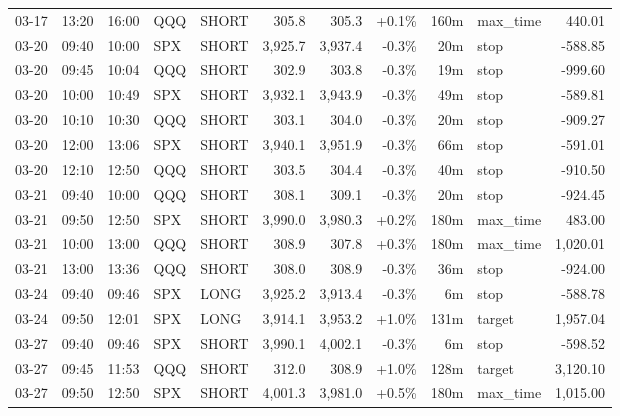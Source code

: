 \documentclass[11pt,a4paper,twoside]{article}
\begin{document}
\begin{center}
\begin{longtable}{>{\color{txtmain}}l l l l l r r r r >{\color{txtmain}}l r}
03-17 & 13:20 & 16:00 & QQQ & SHORT & 305.8 & 305.3 & \textcolor{wingreen}{+0.1\%} & 160m & max\_time & \textcolor{wingreen}{440.01} \\
03-20 & 09:40 & 10:00 & SPX & SHORT & 3,925.7 & 3,937.4 & \textcolor{lossred}{-0.3\%} & 20m & stop & \textcolor{lossred}{-588.85} \\
03-20 & 09:45 & 10:04 & QQQ & SHORT & 302.9 & 303.8 & \textcolor{lossred}{-0.3\%} & 19m & stop & \textcolor{lossred}{-999.60} \\
03-20 & 10:00 & 10:49 & SPX & SHORT & 3,932.1 & 3,943.9 & \textcolor{lossred}{-0.3\%} & 49m & stop & \textcolor{lossred}{-589.81} \\
03-20 & 10:10 & 10:30 & QQQ & SHORT & 303.1 & 304.0 & \textcolor{lossred}{-0.3\%} & 20m & stop & \textcolor{lossred}{-909.27} \\
03-20 & 12:00 & 13:06 & SPX & SHORT & 3,940.1 & 3,951.9 & \textcolor{lossred}{-0.3\%} & 66m & stop & \textcolor{lossred}{-591.01} \\
03-20 & 12:10 & 12:50 & QQQ & SHORT & 303.5 & 304.4 & \textcolor{lossred}{-0.3\%} & 40m & stop & \textcolor{lossred}{-910.50} \\
03-21 & 09:40 & 10:00 & QQQ & SHORT & 308.1 & 309.1 & \textcolor{lossred}{-0.3\%} & 20m & stop & \textcolor{lossred}{-924.45} \\
03-21 & 09:50 & 12:50 & SPX & SHORT & 3,990.0 & 3,980.3 & \textcolor{wingreen}{+0.2\%} & 180m & max\_time & \textcolor{wingreen}{483.00} \\
03-21 & 10:00 & 13:00 & QQQ & SHORT & 308.9 & 307.8 & \textcolor{wingreen}{+0.3\%} & 180m & max\_time & \textcolor{wingreen}{1,020.01} \\
03-21 & 13:00 & 13:36 & QQQ & SHORT & 308.0 & 308.9 & \textcolor{lossred}{-0.3\%} & 36m & stop & \textcolor{lossred}{-924.00} \\
03-24 & 09:40 & 09:46 & SPX & LONG & 3,925.2 & 3,913.4 & \textcolor{lossred}{-0.3\%} & 6m & stop & \textcolor{lossred}{-588.78} \\
03-24 & 09:50 & 12:01 & SPX & LONG & 3,914.1 & 3,953.2 & \textcolor{wingreen}{+1.0\%} & 131m & target & \textcolor{wingreen}{1,957.04} \\
03-27 & 09:40 & 09:46 & SPX & SHORT & 3,990.1 & 4,002.1 & \textcolor{lossred}{-0.3\%} & 6m & stop & \textcolor{lossred}{-598.52} \\
03-27 & 09:45 & 11:53 & QQQ & SHORT & 312.0 & 308.9 & \textcolor{wingreen}{+1.0\%} & 128m & target & \textcolor{wingreen}{3,120.10} \\
03-27 & 09:50 & 12:50 & SPX & SHORT & 4,001.3 & 3,981.0 & \textcolor{wingreen}{+0.5\%} & 180m & max\_time & \textcolor{wingreen}{1,015.00} \\

\end{longtable}
\end{center}
\end{document}
